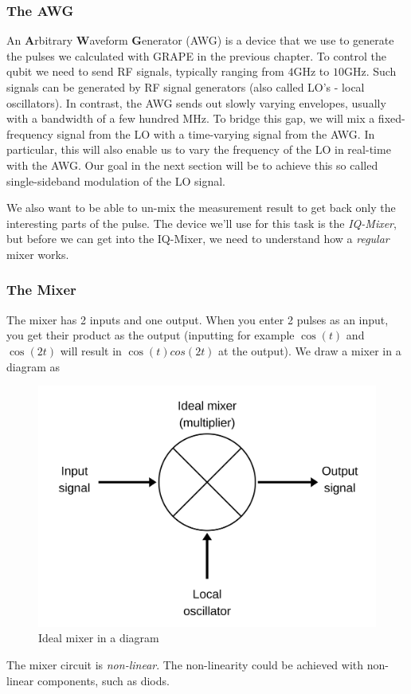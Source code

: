 \subsubsection{The AWG}

An \textbf{A}rbitrary \textbf{W}aveform \textbf{G}enerator (AWG) is a device that we use to generate the pulses we calculated with GRAPE in the previous chapter. To control the qubit we need to send RF signals, typically ranging from $4$GHz to $10$GHz. Such signals can be generated by RF signal generators (also called LO's - local oscillators). In contrast, the AWG sends out slowly varying envelopes, usually with a bandwidth of a few hundred MHz. To bridge this gap, we will mix a fixed-frequency signal from the LO with a time-varying signal from the AWG. In particular, this will also enable us to vary the frequency of the LO in real-time with the AWG. Our goal in the next section will be to achieve this so called single-sideband modulation of the LO signal.

We also want to be able to un-mix the measurement result to get back only the interesting parts of the pulse. The device we'll use for this task is the \textit{IQ-Mixer}, but before we can  get into the IQ-Mixer, we need to understand how a \textit{regular} mixer works.

\subsubsection{The Mixer}
The mixer has 2 inputs and one output. When you enter 2 pulses as an input, you get their product as the output (inputting for example $\cos (t)$ and $\cos (2t)$ will result in $\cos (t)cos (2t)$ at the output).
We draw a mixer in a diagram as
\begin{figure}[H]
    \centering
    \includegraphics[width=0.3\columnwidth]{Ideal-Mixer.png}
    \caption{Ideal mixer in a diagram}
    \label{fig:Ideal-Mixer}
\end{figure}
The mixer circuit is \textit{non-linear}. The non-linearity could be achieved with non-linear components, such as diods.

